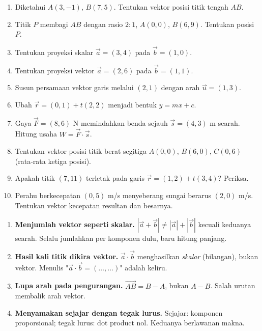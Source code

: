 \documentclass[11pt,a4paper]{report}
\theoremstyle{gaya}
\begin{document}
\begin{latihan}
\begin{enumerate}[leftmargin=*]
  \item Diketahui $A(3,-1)$, $B(7,5)$. Tentukan vektor posisi titik tengah $AB$.
  \item Titik $P$ membagi $AB$ dengan rasio $2:1$, $A(0,0)$, $B(6,9)$. Tentukan posisi $P$.
  \item Tentukan proyeksi skalar $\vec a=(3,4)$ pada $\vec b=(1,0)$.
  \item Tentukan proyeksi vektor $\vec a=(2,6)$ pada $\vec b=(1,1)$.
  \item Susun persamaan vektor garis melalui $(2,1)$ dengan arah $\vec u=(1,3)$.
  \item Ubah $\vec r=(0,1)+t(2,2)$ menjadi bentuk $y=mx+c$.
  \item Gaya $\vec F=(8,6)$ N memindahkan benda sejauh $\vec s=(4,3)$ m searah. Hitung usaha $W=\vec F\cdot\vec s$.
  \item Tentukan vektor posisi titik berat segitiga $A(0,0)$, $B(6,0)$, $C(0,6)$ (rata-rata ketiga posisi).
  \item Apakah titik $(7,11)$ terletak pada garis $\vec r=(1,2)+t(3,4)$? Periksa.
  \item Perahu berkecepatan $(0,5)$ m/s menyeberang sungai berarus $(2,0)$ m/s. Tentukan vektor kecepatan resultan dan besarnya.
\end{enumerate}
\end{latihan}

\begin{kesalahan}
\begin{enumerate}[leftmargin=*,topsep=2pt]
  \item \textbf{Menjumlah vektor seperti skalar.} $|\vec a+\vec b|\neq|\vec a|+|\vec b|$ kecuali keduanya searah. Selalu jumlahkan per komponen dulu, baru hitung panjang.
  \item \textbf{Hasil kali titik dikira vektor.} $\vec a\cdot\vec b$ menghasilkan \emph{skalar} (bilangan), bukan vektor. Menulis "$\vec a\cdot\vec b=(\ldots,\ldots)$" adalah keliru.
  \item \textbf{Lupa arah pada pengurangan.} $\vec{AB}=B-A$, bukan $A-B$. Salah urutan membalik arah vektor.
  \item \textbf{Menyamakan sejajar dengan tegak lurus.} Sejajar: komponen proporsional; tegak lurus: dot product nol. Keduanya berlawanan makna.
\end{enumerate}
\end{kesalahan}
\end{document}
